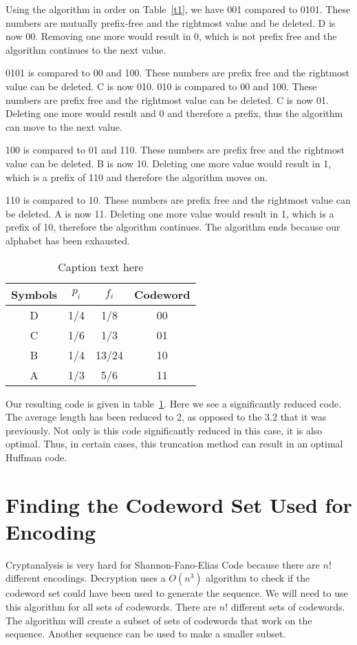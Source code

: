 \documentclass[10pt,letterpaper,notitlepage,draft]{article}
\theoremstyle{definition}
\begin{document}
Using the algorithm in order on Table~\ref{t1}, we have 
001 compared to 0101.  
These numbers are mutually prefix-free and the rightmost value and be deleted.  
D is now 00.  
Removing one more would result in 0, which is not prefix free and the algorithm continues to the next value.

0101 is compared to 00 and 100.
These numbers are prefix free and the rightmost value can be deleted.
C is now 010.
010 is compared to 00 and 100.
These numbers are prefix free and the rightmost value can be deleted.
C is now 01.
Deleting one more would result and 0 and therefore a prefix, thus the algorithm can move to the next value.

100 is compared to 01 and 110.
These numbers are prefix free and the rightmost value can be deleted.
B is now 10.
Deleting one more value would result in 1, which is a prefix of 110 and therefore the algorithm moves on.

110 is compared to 10.
These numbers are prefix free and the rightmost value can be deleted.
A is now 11.
Deleting one more value would result in 1, which is a prefix of 10, therefore the algorithm continues.
The algorithm ends because our alphabet has been exhausted.

\begin{table}[h]
\begin{center}
\begin{tabular}{|c|c|c|c|}
\hline
Symbols & $p_i$ & $f_i$ & Codeword \\
\hline
\hline
D & 1/4 & 1/8 & 00 \\
\hline
C & 1/6 & 1/3 & 01 \\
\hline
B & 1/4 & 13/24 & 10 \\
\hline
A & 1/3 & 5/6 & 11 \\
\hline
\end{tabular}
\end{center}
\caption{Caption text here}\label{t3}
\end{table}

Our resulting code is given in table~\ref{t3}.
Here we see a significantly reduced code.  The average length has been reduced to 2, as opposed to the 3.2 that it was previously.  Not only is this code significantly reduced in this case, it is also optimal.  Thus, in certain cases, this truncation method can result in an optimal Huffman code.


\section{Finding the Codeword Set Used for Encoding}
Cryptanalysis is very hard for Shannon-Fano-Elias Code because there are $n!$ different encodings. 
Decryption uses a $O(n^3)$ algorithm to check if the codeword set could have been used to generate the sequence. 
We will need to use this algorithm for all sets of codewords. There are $n!$ different sets of codewords. 
The algorithm will create a subset of sets of codewords that work on the sequence.
Another sequence can be used to make a smaller subset.
\end{document}
